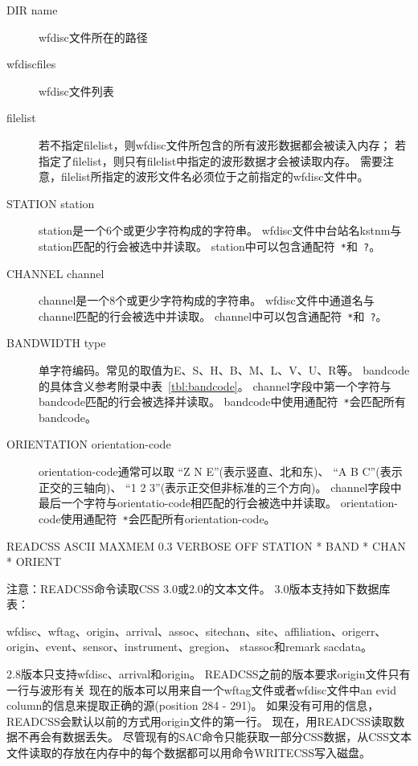 \begin{description}
\item [DIR name] wfdisc文件所在的路径
\item [wfdiscfiles] wfdisc文件列表
\item [filelist] 若不指定filelist，则wfdisc文件所包含的所有波形数据都会被读入内存；
    若指定了filelist，则只有filelist中指定的波形数据才会被读取内存。
    需要注意，filelist所指定的波形文件名必须位于之前指定的wfdisc文件中。
\item[STATION station] station是一个6个或更少字符构成的字符串。
    wfdisc文件中台站名kstnm与station匹配的行会被选中并读取。
    station中可以包含通配符~\verb+*+和~\verb+?+。
\item[CHANNEL channel]  channel是一个8个或更少字符构成的字符串。
    wfdisc文件中通道名与channel匹配的行会被选中并读取。
    channel中可以包含通配符~\verb+*+和~\verb+?+。
\item [BANDWIDTH type] 单字符编码。常见的取值为E、S、H、B、M、L、V、U、R等。
    bandcode的具体含义参考附录中表~\ref{tbl:bandcode}。
    channel字段中第一个字符与bandcode匹配的行会被选择并读取。
    bandcode中使用通配符~\verb+*+会匹配所有bandcode。
\item [ORIENTATION orientation-code] orientation-code通常可以取
    ``Z N E''(表示竖直、北和东)、
    ``A B C''(表示正交的三轴向)、
    ``1 2 3''(表示正交但非标准的三个方向)。
    channel字段中最后一个字符与orientatio-code相匹配的行会被选中并读取。
    orientation-code使用通配符~\verb+*+会匹配所有orientation-code。
\end{description}

\begin{SACSTX}
READCSS ASCII MAXMEM 0.3 VERBOSE OFF STATION * BAND * CHAN * ORIENT
\end{SACSTX}

注意：READCSS命令读取CSS 3.0或2.0的文本文件。
3.0版本支持如下数据库表：

wfdisc、wftag、origin、arrival、assoc、sitechan、site、affiliation、origerr、origin、event、sensor、instrument、gregion、
stassoc和remark sacdata。

2.8版本只支持wfdisc、arrival和origin。
READCSS之前的版本要求origin文件只有一行与波形有关%
现在的版本可以用来自一个wftag文件或者wfdisc文件中an evid column的信息来提取正确的源(position 284 - 291)。%
如果没有可用的信息，READCSS会默认以前的方式用origin文件的第一行。
现在，用READCSS读取数据不再会有数据丢失。
尽管现有的SAC命令只能获取一部分CSS数据，从CSS文本文件读取的存放在内存中的每个数据都可以用命令WRITECSS写入磁盘。


